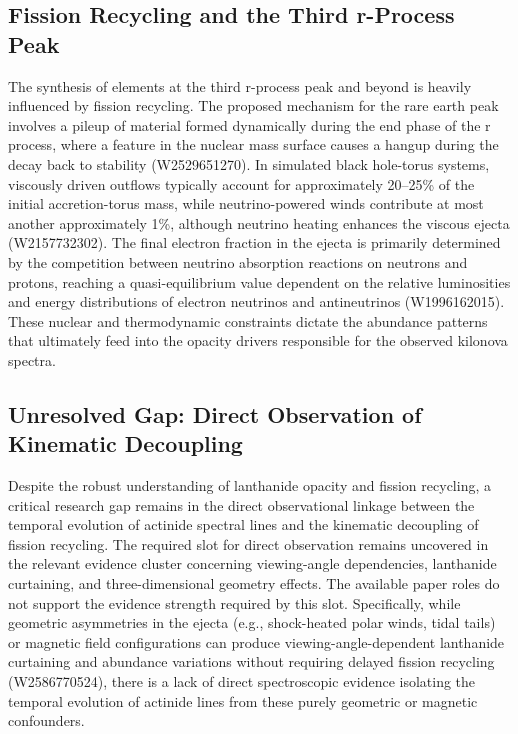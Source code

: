 \documentclass[conference]{IEEEtran}
\begin{document}
\subsection{Fission Recycling and the Third r-Process Peak}
The synthesis of elements at the third r-process peak and beyond is heavily influenced by fission recycling. The proposed mechanism for the rare earth peak involves a pileup of material formed dynamically during the end phase of the r process, where a feature in the nuclear mass surface causes a hangup during the decay back to stability (W2529651270). In simulated black hole-torus systems, viscously driven outflows typically account for approximately 20--25\% of the initial accretion-torus mass, while neutrino-powered winds contribute at most another approximately 1\%, although neutrino heating enhances the viscous ejecta (W2157732302). The final electron fraction in the ejecta is primarily determined by the competition between neutrino absorption reactions on neutrons and protons, reaching a quasi-equilibrium value dependent on the relative luminosities and energy distributions of electron neutrinos and antineutrinos (W1996162015). These nuclear and thermodynamic constraints dictate the abundance patterns that ultimately feed into the opacity drivers responsible for the observed kilonova spectra.~\cite{cite_b89745a07eed477d,cite_403b23aaa35e6b92,cite_c5afe6a1f3d54206}

\subsection{Unresolved Gap: Direct Observation of Kinematic Decoupling}
Despite the robust understanding of lanthanide opacity and fission recycling, a critical research gap remains in the direct observational linkage between the temporal evolution of actinide spectral lines and the kinematic decoupling of fission recycling. The required slot for direct observation remains uncovered in the relevant evidence cluster concerning viewing-angle dependencies, lanthanide curtaining, and three-dimensional geometry effects. The available paper roles do not support the evidence strength required by this slot. Specifically, while geometric asymmetries in the ejecta (e.g., shock-heated polar winds, tidal tails) or magnetic field configurations can produce viewing-angle-dependent lanthanide curtaining and abundance variations without requiring delayed fission recycling (W2586770524), there is a lack of direct spectroscopic evidence isolating the temporal evolution of actinide lines from these purely geometric or magnetic confounders.~\cite{cite_3a00f5f9e5201ba0}
\end{document}
